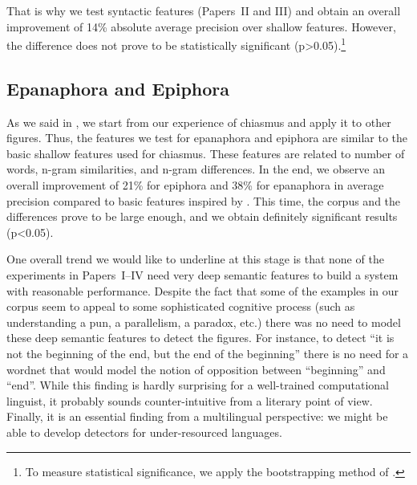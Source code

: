 \noindent
That is why we test syntactic features (Papers~II and III) and obtain an overall improvement of 14\% absolute average precision over shallow features.
 However, the difference does not prove to be statistically significant (p>0.05).\footnote{To measure statistical significance, we apply the bootstrapping method of  \cite{Berg-Kirkpatrick2012}.}
\subsection{Epanaphora and Epiphora}
As we said in , we start from our experience of chiasmus and apply it to other figures.
Thus, the features we test for epanaphora and epiphora are similar to the basic shallow features used for chiasmus. These features are related to number of words, n-gram similarities, and n-gram differences. In the end, we observe an overall improvement of 21\% for epiphora and 38\% for epanaphora in average precision compared to basic features inspired by \cite{Strommer2011}. This time, the corpus and the differences prove to be large enough, and we obtain definitely significant results (p<0.05).

One overall trend we would like to underline at this stage is that none of the experiments in Papers~I--IV need very deep semantic features to build a system with reasonable performance. Despite the fact that some of the examples in our corpus seem to appeal to some sophisticated cognitive process (such as understanding a pun, a parallelism, a paradox, etc.) there was no need to model these deep semantic features to detect the figures. For instance, to detect ``it is not the beginning of the end, but the end of the beginning'' there is no need for a wordnet that would model the notion of opposition between ``beginning'' and ``end''. While this finding is hardly surprising for a well-trained computational linguist, it probably sounds counter-intuitive from a literary point of view. Finally, it is an essential finding from a multilingual perspective: we might be able to develop detectors for under-resourced languages.


